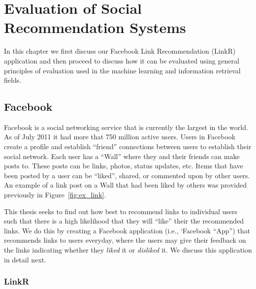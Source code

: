 
\chapter{Evaluation of Social Recommendation Systems}

In this chapter we first discuss our Facebook Link Recommendation
(LinkR) application and then proceed to discuss how it can be
evaluated using general principles of evaluation used in the
machine learning and information retrieval fields.

\section{Facebook}

Facebook is a social networking service that is currently the largest
in the world. As of July 2011 it had more that 750 million active
users. Users in Facebook create a profile and establish ``friend''
connections between users to establish their social network. Each user
has a ``Wall'' where they and their friends can make posts to.  These
posts can be links, photos, status updates, etc.  Items that have been
posted by a user can be ``liked'', shared, or commented upon by other
users.  An example of a link post on a Wall that had been liked
by others was provided previously in Figure~\ref{fig:ex_link}.


This thesis seeks to find out how best to recommend links to
individual users such that there is a high likelihood that they will
``like'' their the recommended links.  We do this by creating a
Facebook application (i.e., `Facebook ``App'') that recommends links
to users everyday, where the users may give their feedback on the
links indicating whether they \emph{liked} it or \emph{disliked} it.
We discuss this application in detail next.

\subsection{LinkR}

